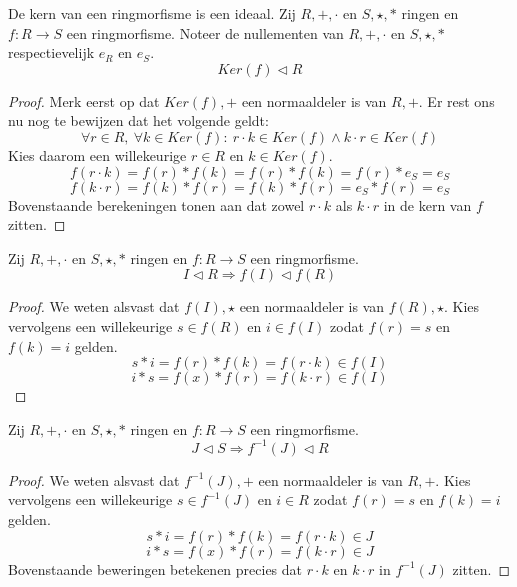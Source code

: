 \documentclass[main.tex]{subfiles}
\begin{document}

\begin{pr}
  \label{pr:kern-ringmorfisme-is-ideaal}
  De kern van een ringmorfisme is een ideaal.
  Zij $R,+,\cdot$ en $S,\star,*$ ringen en $f: R\rightarrow S$ een ringmorfisme.
  Noteer de nullementen van $R,+,\cdot$ en $S,\star,*$ respectievelijk $e_{R}$ en $e_{S}$.
  \[ Ker(f) \triangleleft R \]

  \begin{proof}
    Merk eerst op dat $Ker(f),+$ een normaaldeler is van $R,+$.
    Er rest ons nu nog te bewijzen dat het volgende geldt:
    \[ \forall r\in R,\ \forall k\in Ker(f):\ r\cdot k \in Ker(f) \wedge k\cdot r \in Ker(f) \]
    Kies daarom een willekeurige $r\in R$ en $k\in Ker(f)$.
    \[ f(r\cdot k) = f(r) * f(k) = f(r) * f(k) = f(r) * e_{S} = e_{S} \]
    \[ f(k\cdot r) = f(k) * f(r) = f(k) * f(r) = e_{S} * f(r) = e_{S} \]
    Bovenstaande berekeningen tonen aan dat zowel $r\cdot k$ als $k\cdot r$ in de kern van $f$ zitten.
  \end{proof}
\end{pr}

\begin{ei}
  \label{ei:ringmorfisme-behoudt-ideaal-zijn}
  Zij $R,+,\cdot$ en $S,\star,*$ ringen en $f: R\rightarrow S$ een ringmorfisme.
  \[ I \triangleleft R \Rightarrow f(I) \triangleleft f(R) \]

  \begin{proof}
    We weten alsvast dat $f(I),\star$ een normaaldeler is van $f(R),\star$.
    Kies vervolgens een willekeurige $s\in f(R)$ en $i\in f(I)$ zodat $f(r) = s$ en $f(k) = i$ gelden.
    \[ s * i = f(r) * f(k) = f(r\cdot k) \in f(I) \]
    \[ i * s = f(x) * f(r) = f(k\cdot r) \in f(I) \]
  \end{proof}
\end{ei}

\begin{ei}
  \label{ei:invers-ringmorfisme-behoudt-ideaal-zijn}
  Zij $R,+,\cdot$ en $S,\star,*$ ringen en $f: R\rightarrow S$ een ringmorfisme.
  \[ J \triangleleft S \Rightarrow f^{-1}(J) \triangleleft R \]

  \begin{proof}
    We weten alsvast dat $f^{-1}(J),+$ een normaaldeler is van $R,+$.
    Kies vervolgens een willekeurige $s\in f^{-1}(J)$ en $i\in R$ zodat $f(r) = s$ en $f(k) = i$ gelden.
    \[ s * i = f(r) * f(k) = f(r\cdot k) \in J \]
    \[ i * s = f(x) * f(r) = f(k\cdot r) \in J \]
    Bovenstaande beweringen betekenen precies dat $r \cdot k$ en $k\cdot r$ in $f^{-1}(J)$ zitten.
  \end{proof}
\end{ei}
\end{document}
